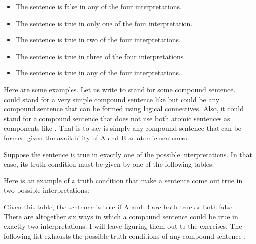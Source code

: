 \begin{itemize}
 
 \item The sentence is false in any of the four interpretations.
  
 \item The sentence is true in only one of the four interpretation.  
  
 \item The sentence is true in two of the four interpretations.  

 \item The sentence is true in three of the four interpretations.  

 \item The sentence is true in any of the four interpretations. 

\end{itemize}

Here are some examples. Let us write  to stand for some compound 
sentence.  could stand for a very simple compound sentence like 
 but could be any compound sentence that can be formed using logical 
connectives. Also, it could stand for a compound sentence that does not use both 
atomic sentences as components like .  That is to 
say  is simply any compound sentence that can be formed given the 
availability of A and B as atomic sentences.
 
Suppose the sentence  is true in exactly one of the possible 
interpretations. In that case, its truth condition must be given by one of the following 
tables:

\begin{center}
\end{center}

Here is an example of  a truth condition that make a sentence come out true in 
two possible interpretations:

\begin{center}
\end{center}

Given this table, the sentence is true if A and B are both true or both false.  
There are altogether six ways in which a compound sentence could be true in 
exactly two interpretations. I will leave figuring them out to the exercises.  The 
following list exhausts the possible truth conditions of any compound sentence 
:

